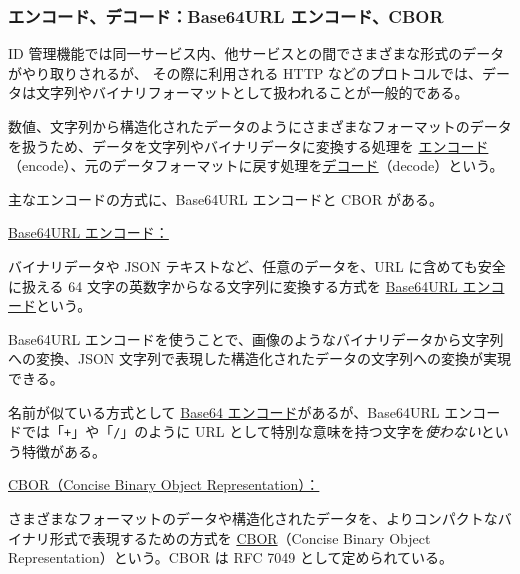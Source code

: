 \documentclass[uplatex]{jsarticle}
\def\label#1{}%
\begin{document}
\subsubsection{エンコード、デコード：Base64URL エンコード、CBOR}

ID 管理機能では同一サービス内、他サービスとの間でさまざまな形式のデータがやり取りされるが、
その際に利用される HTTP などのプロトコルでは、データは文字列やバイナリフォーマットとして扱われることが一般的である。

\begin{dfn}[エンコードとデコード]\label{dfn:ch6-encode-decode}
数値、文字列から構造化されたデータのようにさまざまなフォーマットのデータを扱うため、データを文字列やバイナリデータに変換する処理を
\underline{エンコード}（encode）、元のデータフォーマットに戻す処理を\underline{デコード}（decode）という。
\end{dfn}

主なエンコードの方式に、Base64URL エンコードと CBOR がある。

\underline{Base64URL エンコード：}

\begin{dfn}\label{dfn:base64url}
バイナリデータや JSON テキストなど、任意のデータを、URL に含めても安全に扱える 64 文字の英数字からなる文字列に変換する方式を
\underline{Base64URL エンコード}という。
\end{dfn}

Base64URL エンコードを使うことで、画像のようなバイナリデータから文字列への変換、JSON 文字列で表現した構造化されたデータの文字列への変換が実現できる。

\begin{rem}\label{rem:ch6-base64-vs-base64url}
名前が似ている方式として \underline{Base64 エンコード}があるが、Base64URL エンコードでは「\texttt{+}」や「\texttt{/}」のように
URL として特別な意味を持つ文字を\emph{使わない}という特徴がある。
\end{rem}

\underline{CBOR（Concise Binary Object Representation）：}

\begin{dfn}[CBOR]\label{dfn:cbor}
さまざまなフォーマットのデータや構造化されたデータを、よりコンパクトなバイナリ形式で表現するための方式を
\underline{CBOR}（Concise Binary Object Representation）という。CBOR は RFC 7049 として定められている。
\end{dfn}
\end{document}
